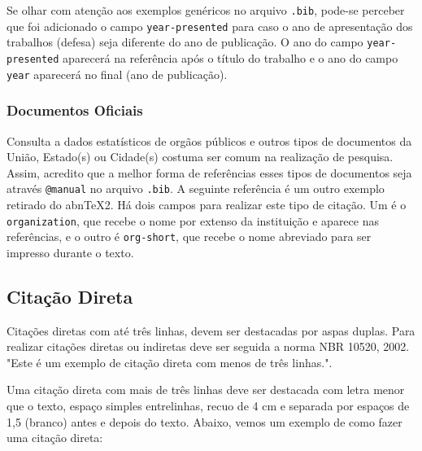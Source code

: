 \documentclass[
  12pt,		%
  a4paper,	%
  openright,%
  oneside,	%
  chapter=TITLE,		%
  section=TITLE,		%
  english,	%
  french,	%
  spanish,	%
  brazil
]{abntex2}
\begin{document}
            Se olhar com atenção aos exemplos genéricos no arquivo \verb|.bib|, pode-se perceber que foi adicionado o campo \verb|year-presented| para caso o ano de apresentação dos trabalhos (defesa) seja diferente do ano de publicação. O ano do campo \verb|year-presented| aparecerá na referência após o título do trabalho e o ano do campo \verb|year| aparecerá no final (ano de publicação).
         
         \subsubsection{Documentos Oficiais}
            
            Consulta a dados estatísticos de orgãos públicos e outros tipos de documentos da União, Estado(s) ou Cidade(s) costuma ser comum na realização de pesquisa. Assim, acredito que a melhor forma de referências esses tipos de documentos seja através \verb|@manual| no arquivo \verb|.bib|. A seguinte referência \cite{brasil} é um outro exemplo retirado do abn\TeX2. Há dois campos para realizar este tipo de citação. Um é o \verb|organization|, que recebe o nome por extenso da instituição e aparece nas referências, e o outro é \verb|org-short|, que recebe o nome abreviado para ser impresso durante o texto.
        
        \subsection{Citação Direta}
        
            Citações diretas com até três linhas, devem ser destacadas por aspas duplas. Para realizar citações diretas ou indiretas deve ser seguida a norma NBR 10520, 2002. "Este é um exemplo de citação direta com menos de três linhas."\cite{artigo}.
    
             Uma citação direta com mais de três linhas deve ser destacada com letra menor que o texto, espaço simples entrelinhas, recuo de 4 cm e separada por espaços de 1,5 (branco) antes e depois do texto. Abaixo, vemos um exemplo de como fazer uma citação direta:
            
            
\end{document}
